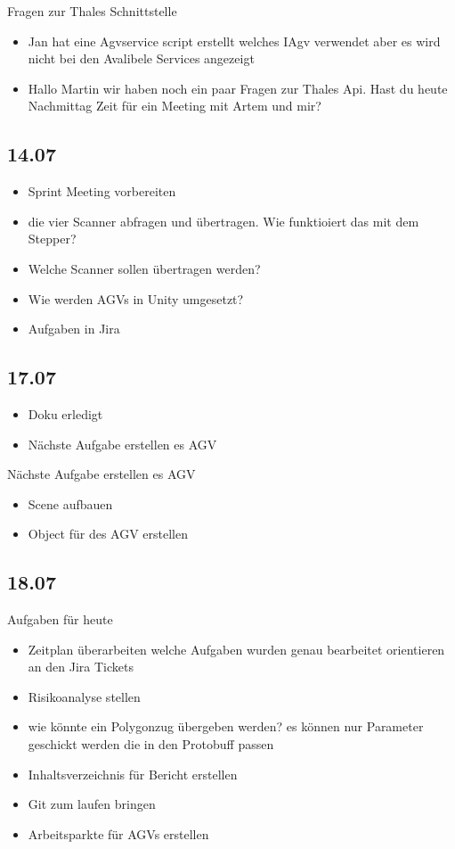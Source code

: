 Fragen zur Thales Schnittstelle
\begin{itemize}
\item Jan hat eine Agvservice script erstellt welches IAgv verwendet aber es wird nicht bei den Avalibele Services angezeigt
\item Hallo Martin wir haben noch ein paar Fragen zur Thales Api. Hast du heute Nachmittag Zeit für ein Meeting mit Artem und mir?
\end{itemize}

\subsection{14.07}
\begin{itemize}
\item Sprint Meeting vorbereiten
\item die vier Scanner abfragen und übertragen. Wie funktioiert das mit dem Stepper?
\item Welche Scanner sollen übertragen werden?
\item Wie werden AGVs in Unity umgesetzt?
\item Aufgaben in Jira 
\end{itemize}

\subsection{17.07}
\begin{itemize}
\item Doku erledigt
\item Nächste Aufgabe erstellen es AGV
\end{itemize}

Nächste Aufgabe erstellen es AGV
\begin{itemize}
\item Scene aufbauen
\item Object für des AGV erstellen 
\end{itemize}

\subsection{18.07}
Aufgaben für heute 
\begin{itemize}
\item Zeitplan überarbeiten welche Aufgaben wurden genau bearbeitet orientieren an den Jira Tickets
\item Risikoanalyse stellen
\item wie könnte ein Polygonzug übergeben werden? es können nur Parameter geschickt werden die in den Protobuff passen
\item Inhaltsverzeichnis für Bericht erstellen
\item Git zum laufen bringen 
\item Arbeitsparkte für AGVs erstellen
\end{itemize}

